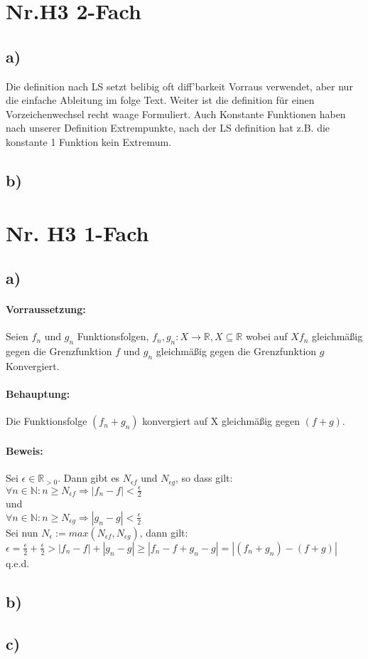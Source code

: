\section*{Nr.H3 2-Fach}

\subsection*{a)}

Die definition nach LS setzt belibig oft diff'barkeit Vorraus verwendet,
aber nur die einfache Ableitung im folge Text.
Weiter ist die definition für einen Vorzeichenwechsel recht waage Formuliert.
Auch Konstante Funktionen haben nach unserer Definition Extrempunkte, nach der LS definition
hat z.B. die konstante 1 Funktion kein Extremum.


\subsection*{b)}

\section*{Nr. H3 1-Fach}

\subsection*{a)}

\paragraph*{Vorraussetzung:} Seien $f_{n}$ und $g_{n}$ Funktionsfolgen, $f_{n}, g_{n} : X \rightarrow \mathbb{R}, X \subseteq \mathbb{R}$ wobei auf $X f_{n}$ gleichmäßig gegen die Grenzfunktion $f$ und $g_{n}$ gleichmäßig gegen die Grenzfunktion $g$ Konvergiert.

\paragraph*{Behauptung:} Die Funktionsfolge $(f_{n}+g_{n})$ konvergiert auf X gleichmäßig gegen $(f+g)$.

\paragraph*{Beweis:} Sei $\epsilon \in \mathbb{R}_{>0}$. Dann gibt es $N_{\epsilon f}$ und $N_{\epsilon g}$, so dass gilt: \\
$\forall n \in \mathbb{N} : n \geq N_{\epsilon f} \Rightarrow |f_{n}-f| < \frac{\epsilon} {2}$\\
und \\
$\forall n \in \mathbb{N} : n \geq N_{\epsilon g} \Rightarrow |g_{n}-g| < \frac{\epsilon} {2}$ \\
Sei nun  $N_{\epsilon} := max(N_{\epsilon f}, N_{\epsilon g})$, dann gilt: \\
$\epsilon = \frac{\epsilon} {2}+\frac{\epsilon} {2} > |f_{n}-f|+|g_{n}-g| \geq |f_{n}-f+g_{n}-g| = |(f_{n}+g_{n})-(f+g)|$\\
q.e.d.

\subsection*{b)}


\subsection*{c)}